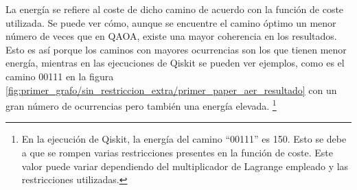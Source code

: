 \documentclass{article}
\begin{document}
La energía se refiere al coste de dicho camino de acuerdo con la función de coste utilizada. Se puede ver cómo, aunque se encuentre el camino óptimo un menor número de veces que en QAOA, existe una mayor coherencia en los resultados. Esto es así porque los caminos con mayores ocurrencias son los que tienen menor energía, mientras en las ejecuciones de Qiskit se pueden ver ejemplos, como es el camino 00111 en la figura \ref{fig:primer_grafo/sin_restriccion_extra/primer_paper_aer_resultado} con un gran número de ocurrencias pero también una energía elevada.
\footnote{En la ejecución de Qiskit, la energía del camino ``00111'' es 150. Esto se debe a que se rompen varias restricciones presentes en la función de coste. Este valor puede variar dependiendo del multiplicador de Lagrange empleado
  y las restricciones utilizadas.}
\end{document}
